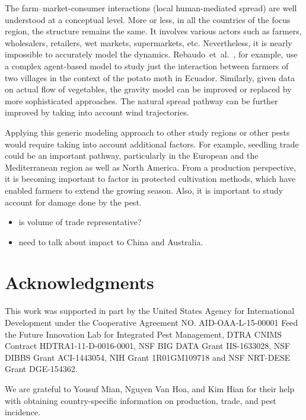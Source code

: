 \documentclass[11pt]{article}
\theoremstyle{definition}
\begin{document}
The farm--market-consumer interactions (local human-mediated spread) are
well understood at a conceptual level. More or less, in all the countries
of the focus region, the structure remains the same. It involves various
actors such as farmers, wholesalers, retailers, wet markets, supermarkets,
etc. Nevertheless, it is nearly impossible to accurately model the dynamics.
Rebaudo~et~al.~\cite{rebaudo2011}, for example, use a complex
agent-based model to study just the interaction between farmers of two
villages in the context of the potato moth in Ecuador. Similarly, given data on
actual flow of vegetables, the gravity model can be improved or replaced by
more sophisticated approaches. The natural spread pathway can be further
improved by taking into account wind trajectories.

Applying this generic modeling approach to other study regions or other
pests would require taking into account additional factors. For example,
seedling trade could be an important pathway, particularly in the European
and the Mediterranean region as well as North America. From a production
perspective, it is becoming important to factor in protected cultivation
methods, which have enabled farmers to extend the growing season. Also, it
is important to study account for damage done by the pest.
 \begin{itemize}
     \item is volume of trade representative?
     \item need to talk about impact to China and Australia.
 \end{itemize}

\section*{Acknowledgments}
This work was supported in part by the United States Agency for
International Development under the Cooperative Agreement NO.
AID-OAA-L-15-00001 Feed the Future Innovation Lab for Integrated Pest
Management, DTRA CNIMS Contract HDTRA1-11-D-0016-0001, NSF BIG DATA Grant
IIS-1633028, NSF DIBBS Grant ACI-1443054, NIH Grant 1R01GM109718 and NSF
NRT-DESE Grant DGE-154362.

We are grateful to Yousuf Mian, Nguyen Van Hoa, and Kim Hian for their help
with obtaining country-specific information on production, trade, and pest
incidence.


\end{document}
